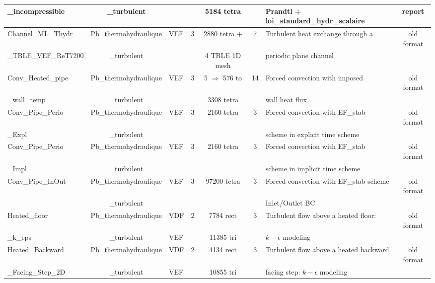 \begin{table}[H]
\begin{centering}
\begin{tabular}{lclccclc}
\rowcolor{Blue!10}\_incompressible & \_turbulent & & & 5184 tetra & & Prandtl + loi\_standard\_hydr\_scalaire & report \\ \hline
\rowcolor{Blue!10}Channel\_ML\_Thydr & Pb\_thermohydraulique & VEF & 3 & 2880 tetra + & 7 & Turbulent heat exchange through a  & old format \\ 
\rowcolor{Blue!10}\_TBLE\_VEF\_ReT7200 & \_turbulent & & & 4 TBLE 1D mesh & & periodic plane channel & \\ \hline
\rowcolor{Blue!10}Conv\_Heated\_pipe & Pb\_thermohydraulique & VEF & 3 & 5 $\Rightarrow$ 576 to & 14 & Forced convection with imposed & old format \\ 
\rowcolor{Blue!10}\_wall\_temp & \_turbulent & & & 3308 tetra & & wall heat flux & \\ \hline
\rowcolor{Blue!10}Conv\_Pipe\_Perio & Pb\_thermohydraulique & VEF & 3 & 2160 tetra & 3 & Forced convection with EF\_stab  & old format \\ 
\rowcolor{Blue!10}\_Expl & \_turbulent & & & & & scheme in explicit time scheme & \\ \hline
\rowcolor{Blue!10}Conv\_Pipe\_Perio & Pb\_thermohydraulique & VEF & 3 & 2160 tetra & 3 & Forced convection with EF\_stab & old format \\ 
\rowcolor{Blue!10}\_Impl & \_turbulent & & & & & scheme in implicit time scheme &  \\ \hline
\rowcolor{Blue!10}Conv\_Pipe\_InOut & Pb\_thermohydraulique & VEF & 3 & 97200 tetra & 3 & Forced convection with EF\_stab scheme & old format \\ 
\rowcolor{Blue!10} & \_turbulent & & & & & Inlet/Outlet BC & \\ \hline
\rowcolor{Blue!10}Heated\_floor & Pb\_thermohydraulique & VDF & 2 & 7784 rect & 3 & Turbulent flow above a heated floor:  & old format \\ 
\rowcolor{Blue!10}\_k\_eps & \_turbulent & VEF & & 11385 tri & & $k-\epsilon$ modeling & \\ \hline
\rowcolor{Blue!10}Heated\_Backward & Pb\_thermohydraulique & VDF & 2 & 4134 rect & 3 & Turbulent flow above a heated backward & old format \\ 
\rowcolor{Blue!10}\_Facing\_Step\_2D & \_turbulent & VEF & & 10855 tri & & facing step: $k-\epsilon$ modeling & \\ \hline
	\end{tabular}
\end{centering}
\end{table}

